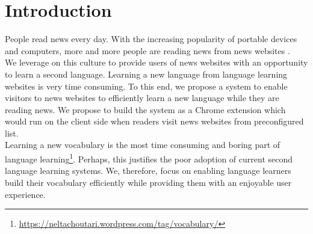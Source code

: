 \section{Introduction}
People read news every day. With the increasing popularity of 
portable devices and computers, more and more people are reading 
news from news websites \cite{yarlh2012}.
\\
We leverage on this culture to provide users of news websites 
with an opportunity to learn a second language.
Learning a new language from language learning websites is very time consuming. 
To this end, we propose a system to enable visitors to news websites to 
efficiently learn a new language while they are reading news. We propose to 
build the system as a Chrome extension which would run on the client side 
when readers visit news websites from preconfigured list.
\\
Learning a new vocabulary is the most time consuming and boring part of 
language learning\footnote{\url{https://neltachoutari.wordpress.com/tag/vocabulary/}}. Perhaps, this justifies the 
poor adoption of current second language learning systems. We, therefore, 
focus on enabling language learners build their vocabulary efficiently while 
providing them with an enjoyable user experience.
